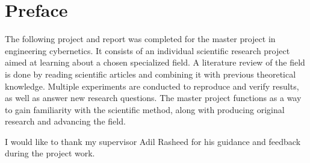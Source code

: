 \chapter*{Preface}

The following project and report was completed for the master project in engineering cybernetics. It consists of an individual scientific research project aimed at learning about a chosen specialized field. A literature review of the field is done by reading scientific articles and combining it with previous theoretical knowledge. Multiple experiments are conducted to reproduce and verify results, as well as answer new research questions. The master project functions as a way to gain familiarity with the scientific method, along with producing original research and advancing the field.

I would like to thank my supervisor Adil Rasheed for his guidance and feedback during the project work.